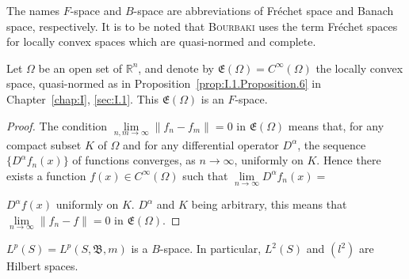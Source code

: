 \begin{remarku} The names $F$-space and $B$-space are abbreviations of Fréchet space and Banach space, respectively. It is to be noted that \textsc{Bourbaki} uses the term Fréchet spaces for locally convex spaces which are quasi-normed and complete. 
\end{remarku}

\begin{proposition}\label{prop:I.9.Proposition.1} Let $\Omega$ be an open set of $\mathbb{R}^{n}$, and denote by $\mathfrak{E}(\Omega) = C^\infty(\Omega)$ the locally convex space, quasi-normed as in Proposition~\ref{prop:I.1.Proposition.6} in Chapter~\ref{chap:I}, \ref{sec:I.1}. This $\mathfrak{E}(\Omega)$ is an $F$-space. 
\end{proposition}

\begin{proof}
 The condition $\lim\limits_{n,m\to \infty}\|f_n- f_m\| = 0$ in $\mathfrak{E}(\Omega)$ means that, for any compact subset $K$ of $\Omega$ and for any differential operator $D^{\alpha}$, the sequence $\{D^{\alpha}f_n(x)\}$ of functions converges, as $n\to \infty$, uniformly on $K$. Hence there exists a function $f(x)\in C^{\infty}(\Omega)$ such that $\lim\limits_{n\to \infty}D^{\alpha}f_n(x) =$ 

$D^{\alpha}f(x)$ uniformly on $K$. $D^{\alpha}$ and $K$ being arbitrary, this means that $\lim\limits_{n\to \infty}\| f_n- f\| = 0$ in $\mathfrak{E}(\Omega)$. 
\end{proof}

\begin{proposition}\label{prop:I.9.Proposition.2} $L^p(S) = L^p(S, \mathfrak{B}, m)$ is a $B$-space. In particular, $L^2(S)$ and $(l^2)$ are Hilbert spaces. 
\end{proposition}


